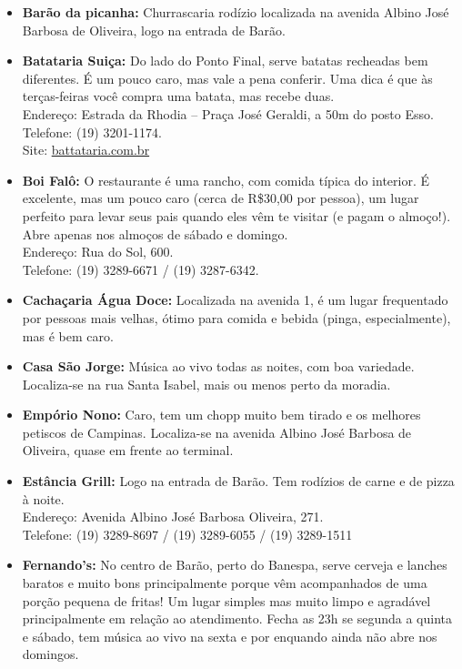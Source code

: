 \begin{itemize}
\item   \textbf{Barão da picanha:} Churrascaria rodízio localizada na avenida
        Albino José Barbosa de Oliveira, logo na entrada de Barão.

\item   \textbf{Batataria Suiça:} Do lado do Ponto Final, serve batatas
        recheadas bem diferentes. É um pouco caro, mas vale a pena conferir. Uma
        dica é que às terças-feiras você compra uma batata, mas recebe duas.
        \\Endereço: Estrada da Rhodia -- Praça José Geraldi, a 50m do posto Esso.
        \\Telefone: (19) 3201-1174.
        \\Site: \url{battataria.com.br}

\item   \textbf{Boi Falô:} O restaurante é uma rancho, com comida típica do
        interior. É excelente, mas um pouco caro (cerca de R\$30,00 por pessoa),
        um lugar perfeito para levar seus pais quando eles vêm te visitar (e
        pagam o almoço!). Abre apenas nos almoços de sábado e domingo.
        \\Endereço: Rua do Sol, 600.
        \\Telefone: (19) 3289-6671 / (19) 3287-6342.

\item   \textbf{Cachaçaria Água Doce:} Localizada na avenida 1, é um lugar
        frequentado por pessoas mais velhas, ótimo para comida e bebida (pinga,
        especialmente), mas é bem caro.

\item   \textbf{Casa São Jorge:} Música ao vivo todas as noites, com boa
        variedade. Localiza-se na rua Santa Isabel, mais ou menos perto da
        moradia.

\item   \textbf{Empório Nono:} Caro, tem um chopp muito bem tirado e os melhores
        petiscos de Campinas. Localiza-se na avenida Albino José Barbosa de
        Oliveira, quase em frente ao terminal.

\item   \textbf{Estância Grill:} Logo na entrada de Barão. Tem rodízios de
        carne e de pizza à noite.
        \\Endereço: Avenida Albino José Barbosa Oliveira, 271.
        \\Telefone: (19) 3289-8697 / (19) 3289-6055 / (19) 3289-1511

\item   \textbf{Fernando's:} No centro de Barão, perto do Banespa, serve cerveja
        e lanches baratos e muito bons principalmente porque vêm acompanhados de
        uma porção pequena de fritas! Um lugar simples mas muito limpo e
        agradável principalmente em relação ao atendimento. Fecha as 23h se
        segunda a quinta e sábado, tem música ao vivo na sexta e por enquando
        ainda não abre nos domingos.


\end{itemize}
